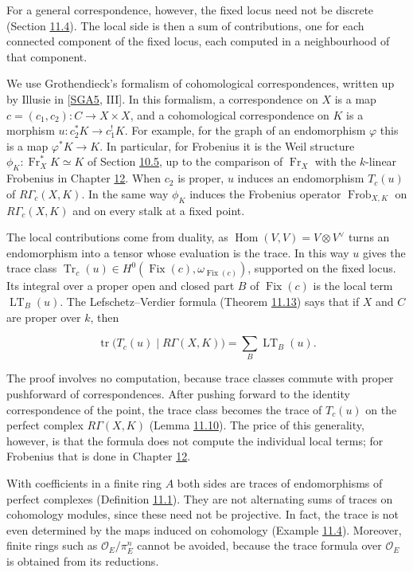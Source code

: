\documentclass[11pt]{article}
\providecommand{\Fix}{}\renewcommand{\Fix}{\operatorname{Fix}}
\begin{document}
For a general correspondence, however, the fixed locus need not be discrete (Section \hyperref[bp195]{11.4}). The local side is then a sum of contributions, one for each connected component of the fixed locus, each computed in a neighbourhood of that component.

We use Grothendieck's formalism of cohomological correspondences, written up by Illusie in [\hyperref[bp332]{SGA5}, III]. In this formalism, a correspondence on \(X\) is a map \(c=(c_1,c_2):C\to X\times X\), and a cohomological correspondence on \(K\) is a morphism \(u:c_2^*K\to c_1^!K\). For example, for the graph of an endomorphism \(\varphi\) this is a map \(\varphi^*K\to K\). In particular, for Frobenius it is the Weil structure \(\phi_K:\operatorname{Fr}_X^*K\simeq K\) of Section \hyperref[bp154]{10.5}, up to the comparison of \(\operatorname{Fr}_X\) with the \(k\)-linear Frobenius in Chapter \hyperref[bp226]{12}. When \(c_2\) is proper, \(u\) induces an endomorphism \(T_c(u)\) of \(R\Gamma_c(X,K)\). In the same way \(\phi_K\) induces the Frobenius operator \(\operatorname{Frob}_{X,K}\) on \(R\Gamma_c(X,K)\) and on every stalk at a fixed point.

The local contributions come from duality, as \(\operatorname{Hom}(V,V)=V\otimes
V^\vee\) turns an endomorphism into a tensor whose evaluation is the trace. In this way \(u\) gives the trace class \(\operatorname{Tr}_c(u)\in H^0(\Fix(c),\omega_{\Fix(c)})\), supported on the fixed locus. Its integral over a proper open and closed part \(B\) of \(\Fix(c)\) is the local term \(\operatorname{LT}_B(u)\). The Lefschetz–Verdier formula (Theorem \hyperref[bp206]{11.13}) says that if \(X\) and \(C\) are proper over \(k\), then

\[
\operatorname{tr}\bigl(T_c(u)\mid R\Gamma(X,K)\bigr)
=\sum_B\operatorname{LT}_B(u).
\]

The proof involves no computation, because trace classes commute with proper pushforward of correspondences. After pushing forward to the identity correspondence of the point, the trace class becomes the trace of \(T_c(u)\) on the perfect complex \(R\Gamma(X,K)\) (Lemma \hyperref[bp199]{11.10}). The price of this generality, however, is that the formula does not compute the individual local terms; for Frobenius that is done in Chapter \hyperref[bp226]{12}.

With coefficients in a finite ring \(A\) both sides are traces of endomorphisms of perfect complexes (Definition \hyperref[bp174]{11.1}). They are not alternating sums of traces on cohomology modules, since these need not be projective. In fact, the trace is not even determined by the maps induced on cohomology (Example \hyperref[bp181]{11.4}). Moreover, finite rings such as \(\mathcal O_E/\pi_E^n\) cannot be avoided, because the trace formula over \(\mathcal O_E\) is obtained from its reductions.
\end{document}
